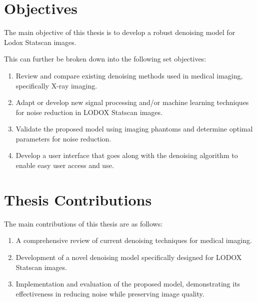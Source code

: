 \section{Objectives}
The main objective of this thesis is to develop a robust denoising model for Lodox Statscan images. 

This can further be broken down into the following set objectives:

\begin{enumerate}
    \item Review and compare existing denoising methods used in medical imaging, specifically X-ray imaging.
    \item Adapt or develop new signal processing and/or machine learning techniques for noise reduction in LODOX\textsuperscript{\textregistered} Statscan\textsuperscript{\textregistered} images.
    \item Validate the proposed model using imaging phantoms and determine optimal parameters for noise reduction.
    \item Develop a user interface that goes along with the denoising algorithm to enable easy user access and use.
\end{enumerate}
 

\section[Contributions]{Thesis Contributions}
The main contributions of this thesis are as follows:

\begin{enumerate}
    \item A comprehensive review of current denoising techniques for medical imaging.
    \item Development of a novel denoising model specifically designed for LODOX\textsuperscript{\textregistered} Statscan\textsuperscript{\textregistered} images.
    \item Implementation and evaluation of the proposed model, demonstrating its effectiveness in reducing noise while preserving image quality.
\end{enumerate}
 






